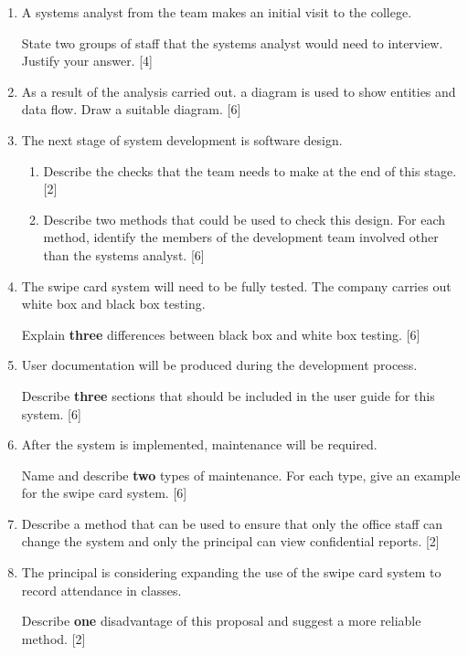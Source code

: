 \begin{enumerate}
\item A systems analyst from the team makes an initial visit to the college. 

State two groups of staff that the systems analyst would need to interview.
Justify your answer. \hfill{}{[}4{]}
\item As a result of the analysis carried out. a diagram is used to show
entities and data flow. Draw a suitable diagram. \hfill{}{[}6{]}
\item The next stage of system development is software design.
\begin{enumerate}
\item Describe the checks that the team needs to make at the end of this
stage. \hfill{}{[}2{]}
\item Describe two methods that could be used to check this design. For
each method, identify the members of the development team involved
other than the systems analyst. {[}6{]}
\end{enumerate}
\item The swipe card system will need to be fully tested. The company carries
out white box and black box testing. 

Explain \textbf{three} differences between black box and white box
testing. \hfill{}{[}6{]}
\item User documentation will be produced during the development process. 

Describe \textbf{three} sections that should be included in the user
guide for this system.\hfill{} {[}6{]}
\item After the system is implemented, maintenance will be required. 

Name and describe \textbf{two} types of maintenance. For each type,
give an example for the swipe card system. \hfill{}{[}6{]}
\item Describe a method that can be used to ensure that only the office
staff can change the system and only the principal can view confidential
reports. \hfill{}{[}2{]}
\item The principal is considering expanding the use of the swipe card system
to record attendance in classes. 

Describe \textbf{one} disadvantage of this proposal and suggest a
more reliable method.\hfill{} {[}2{]}
\end{enumerate}